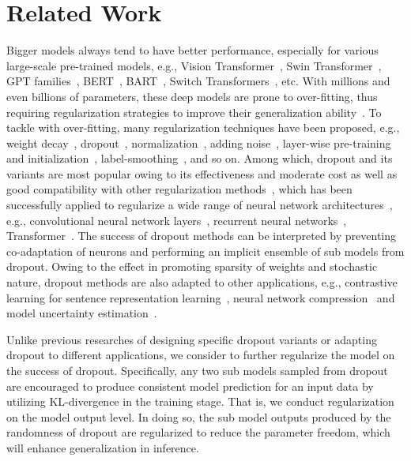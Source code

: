 \documentclass{article}
\begin{document}
\section{Related Work}


Bigger models always tend to have better performance, 
especially for various large-scale pre-trained models, e.g., Vision Transformer~\cite{dosovitskiy2021an}, Swin Transformer~\cite{liu2021swin}, GPT families~\cite{radford2018improving,radford2019language,brown2020language}, BERT~\cite{devlin2019bert}, BART~\cite{lewis2020bart}, Switch Transformers~\cite{fedus2021switch}, etc.
With millions and even billions of parameters, these deep models are prone to over-fitting, thus requiring regularization strategies to improve their generalization ability~\cite{labach2019survey}.
To tackle with over-fitting, many regularization techniques have been proposed, e.g., weight decay~\cite{krogh1992simple,krizhevsky2012imagenet,kang2016shakeout,wen2016learning}, dropout~\cite{hinton2012improving,wan2013regularization,ba2013adaptive,wang2013fast,srivastava2014dropout}, normalization~\cite{ioffe2015batch,salimans2016weight,ba2016layer,huang2018orthogonal,wu2018group}, adding noise~\cite{hochreiter1995simplifying,poole2014analyzing}, layer-wise pre-training and initialization~\cite{erhan2009difficulty,he2015delving}, label-smoothing~\cite{szegedy2016rethinking}, and so on.
Among which, dropout and its variants are most popular owing to its effectiveness and moderate cost as well as good compatibility with other regularization methods~\cite{moradi2020survey}, which has been successfully applied to regularize a wide range of neural network architectures~\cite{pham2021autodropout}, e.g., convolutional neural network layers~\cite{wu2015towards,devries2017improved}, recurrent neural networks~\cite{gal2016theoretically,semeniuta2016recurrent,merity2018regularizing}, Transformer~\cite{zehui2019dropattention,zhou2020scheduled,wu2021not}.
The success of dropout methods can be interpreted by preventing co-adaptation of neurons and performing an implicit ensemble of sub models from dropout.
Owing to the effect in promoting sparsity of weights and stochastic nature, dropout methods are also adapted to other applications, e.g., contrastive learning for sentence representation learning~\cite{gao2021simcse}, neural network compression~\cite{molchanov2017variational,neklyudov2017structured} and model uncertainty estimation~\cite{gal2016dropout}.

Unlike previous researches of designing specific dropout variants or adapting dropout to different applications, we consider to further regularize the model on the success of dropout.
Specifically, any two sub models sampled from dropout are encouraged to produce consistent model prediction for an input data by utilizing KL-divergence in the training stage.
That is, we conduct regularization on the model output level.
In doing so, the sub model outputs produced by the randomness of dropout are regularized to reduce the parameter freedom, which will enhance generalization in inference.
\end{document}
